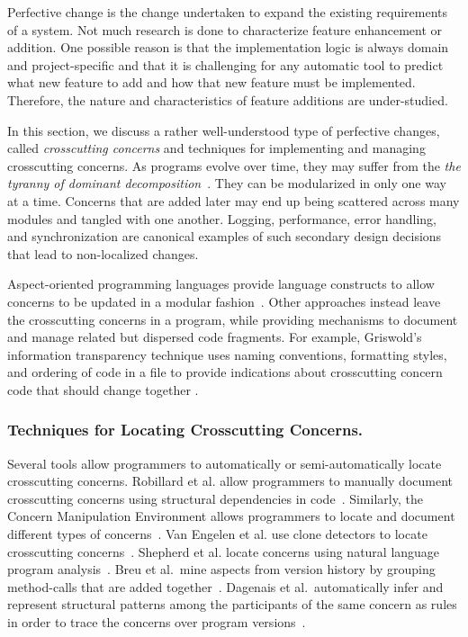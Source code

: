 Perfective change is the change undertaken to expand the existing requirements of a system. Not much research is done to characterize feature enhancement or addition. One possible reason is that the implementation logic is always domain and project-specific and that it is challenging for any automatic tool to predict what new feature to add and how that new feature must be implemented. Therefore, the nature and characteristics of feature additions are under-studied. 

In this section, we discuss a rather well-understood type of perfective changes, called {\em crosscutting concerns} and techniques for implementing and managing crosscutting concerns. As programs evolve over time, they may suffer from the {\it the tyranny of dominant decomposition}~\cite{Tarr1999}. They can be modularized in only one way at a time. Concerns that are added later may end up being scattered across many modules and tangled with one another. Logging, performance, error handling, and synchronization are canonical examples of such secondary design decisions that lead to non-localized changes.
  
Aspect-oriented programming languages provide language constructs to allow concerns to be updated in a modular fashion~\cite{Kiczales2001:OA}. Other approaches instead leave the crosscutting concerns in a program, while providing mechanisms to document and manage related but dispersed code fragments. For example, Griswold's information transparency technique uses naming conventions, formatting styles, and ordering of code in a file to provide indications about crosscutting concern code that should change together \cite{Griswold2001}. 

\subsubsection{Techniques for Locating Crosscutting Concerns.}
Several tools allow programmers to automatically or semi-automatically locate crosscutting concerns. Robillard et al. allow programmers to manually document crosscutting concerns using structural dependencies in code~\cite{Robillard2003}. Similarly, the Concern Manipulation Environment allows programmers to locate and document different types of concerns~\cite{Harrison2005}. Van Engelen et al. use clone detectors to locate crosscutting concerns~\cite{VanEngelen2005}. Shepherd et al. locate concerns using natural language program analysis~\cite{Shepherd2007}. Breu et al.~mine aspects from version history by grouping method-calls that are added together~\cite{Breu2006}. Dagenais et al.~automatically infer and represent structural patterns among the participants of the same concern as rules in order to trace the concerns over program versions~\cite{Dagenais2007}. 

